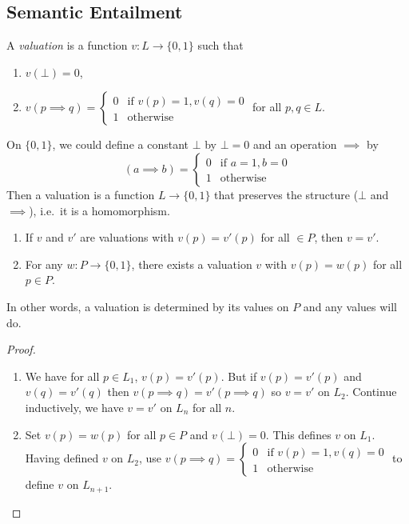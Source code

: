 \documentclass[a4paper]{article}
\begin{document}
\subsection{Semantic Entailment}

\begin{definition}[Valuation]
  A \emph{valuation} is a function \(v: L \to \{0, 1\}\) such that
  \begin{enumerate}
  \item \(v(\bot) = 0\),
  \item \(v(p \implies q) = \begin{cases} 0 & \text{if } v(p) = 1, v(q) = 0 \\ 1 & \text{otherwise} \end{cases}\) for all \(p, q \in L\).
  \end{enumerate}
\end{definition}

\begin{remark}
  On \(\{0, 1\}\), we could define a constant \(\bot\) by \(\bot = 0\) and an operation \(\implies\) by
  \[
    (a \implies b) =
    \begin{cases}
      0 & \text{if } a = 1, b = 0 \\
      1 & \text{otherwise}
    \end{cases}
  \]
  Then a valuation is a function \(L \to \{0, 1\}\) that preserves the structure (\(\bot\) and \(\implies\)), i.e.\ it is a homomorphism.
\end{remark}

\begin{proposition}\leavevmode
  \begin{enumerate}
  \item If \(v\) and \(v'\) are valuations with \(v(p) = v'(p)\) for all \( \in P\), then \(v = v'\).
  \item For any \(w: P \to \{0, 1\}\), there exists a valuation \(v\) with \(v(p) = w(p)\) for all \(p \in P\).
  \end{enumerate}
\end{proposition}

In other words, a valuation is determined by its values on \(P\) and any values will do.

\begin{proof}\leavevmode
  \begin{enumerate}
  \item We have for all \(p \in L_1\), \(v(p) = v'(p)\). But if \(v(p) = v'(p)\) and \(v(q) = v'(q)\) then \(v(p \implies q) = v'(p \implies q)\) so \(v = v'\) on \(L_2\). Continue inductively, we have \(v = v'\) on \(L_n\) for all \(n\).
  \item Set \(v(p) = w(p)\) for all \(p \in P\) and \(v(\bot) = 0\). This defines \(v\) on \(L_1\). Having defined \(v\) on \(L_2\), use \(v(p \implies q) = \begin{cases} 0 & \text{if } v(p) = 1, v(q) = 0 \\ 1 & \text{otherwise} \end{cases}\) to define \(v\) on \(L_{n + 1}\).
  \end{enumerate}
\end{proof}
\end{document}
